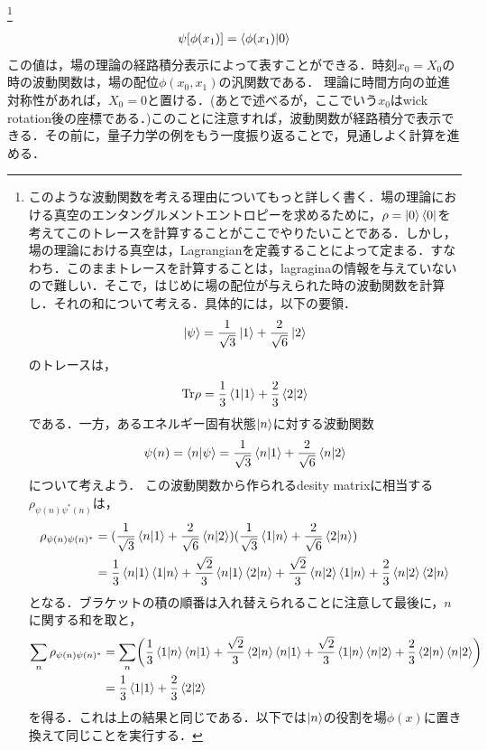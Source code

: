 \footnote{このような波動関数を考える理由についてもっと詳しく書く．場の理論における真空のエンタングルメントエントロピーを求めるために，$\rho=\ket{0}\bra{0}$を考えてこのトレースを計算することがここでやりたいことである．しかし，場の理論における真空は，Lagrangianを定義することによって定まる．すなわち．このままトレースを計算することは，lagraginaの情報を与えていないので難しい．そこで，はじめに場の配位が与えられた時の波動関数を計算し．それの和について考える．具体的には，以下の要領．
\begin{align}
  \ket{\psi}=\frac{1}{\sqrt{3}}\ket{1}+\frac{2}{\sqrt{6}}\ket{2}
\end{align}
のトレースは，
\begin{align}
  \mathrm{Tr}\rho=\frac{1}{3}\braket{1|1}+\frac{2}{3}\braket{2|2}
\end{align}
である．一方，あるエネルギー固有状態$\ket{n}$に対する波動関数
\begin{align}
  \psi(n)=\braket{n|\psi}=\frac{1}{\sqrt{3}}\braket{n|1}+\frac{2}{\sqrt{6}}\braket{n|2}
\end{align}について考えよう．
この波動関数から作られるdesity matrixに相当する$\rho_{\psi(n)\psi^{*}(n)}$は，
\begin{align}
  \rho_{\psi(n)\psi(n)^{*}}&=(\frac{1}{\sqrt{3}}\braket{n|1}+\frac{2}{\sqrt{6}}\braket{n|2})(\frac{1}{\sqrt{3}}\braket{1|n}+\frac{2}{\sqrt{6}}\braket{2|n})\\
  &=\frac{1}{3}\braket{n|1}\braket{1|n}+\frac{\sqrt{2}}{3}\braket{n|1}\braket{2|n}
  +\frac{\sqrt{2}}{3}\braket{n|2}\braket{1|n}+\frac{2}{3}\braket{n|2}\braket{2|n}
\end{align}となる．ブラケットの積の順番は入れ替えられることに注意して最後に，$n$に関する和を取と，
\begin{align}
  \sum_{n}\rho_{\psi(n)\psi(n)^{*}}&=  \sum_{n}\biggl(\frac{1}{3}\braket{1|n}\braket{n|1}+\frac{\sqrt{2}}{3}\braket{2|n}\braket{n|1}
  +\frac{\sqrt{2}}{3}\braket{1|n}\braket{n|2}+\frac{2}{3}\braket{2|n}\braket{n|2}\biggr)\\
  &=\frac{1}{3}\braket{1|1}+\frac{2}{3}\braket{2|2}
\end{align}
を得る．これは上の結果と同じである．以下では$\ket{n}$の役割を場$\phi(x)$に置き換えて同じことを実行する．}
\begin{align}
  \psi[\phi(x_{1})]=\braket{\phi(x_1)|0}
\end{align}
この値は，場の理論の経路積分表示によって表すことができる．時刻$x_0=X_0$の時の波動関数は，場の配位$\phi(x_0,x_1)$の汎関数である．
理論に時間方向の並進対称性があれば，$X_0=0$と置ける．(あとで述べるが，ここでいう$x_0$はwick rotation後の座標である．)このことに注意すれば，波動関数が経路積分で表示できる．その前に，量子力学の例をもう一度振り返ることで，見通しよく計算を進める．

